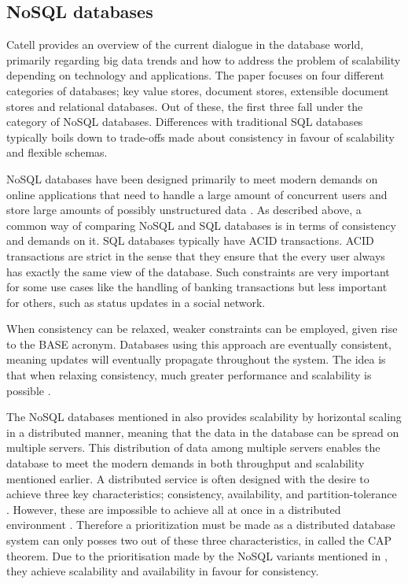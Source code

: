 \subsection{NoSQL databases}
Catell \cite{Catell} provides an overview of the current dialogue in the database world, primarily regarding big data trends and how to address the problem of scalability depending on technology and applications. The paper focuses on four different categories of databases; key value stores, document stores, extensible document stores and relational databases. Out of these, the first three fall under the category of NoSQL databases. Differences with traditional SQL databases typically boils down to trade-offs made about consistency in favour of scalability and flexible schemas. 

NoSQL databases have been designed primarily to meet modern demands on online applications that need to handle a large amount of concurrent users and store large amounts of possibly unstructured data \cite{Catell}.
As described above, a common way of comparing NoSQL and SQL databases is in terms of consistency and demands on it. SQL databases typically have ACID \cite{Mullins} transactions. ACID transactions are strict in the sense that they ensure that the every user always has exactly the same view of the database. Such constraints are very important for some use cases like the handling of banking transactions but less important for others, such as status updates in a social network.

When consistency can be relaxed, weaker constraints can be employed, given rise to the BASE \cite{Catell} acronym. Databases using this approach are eventually consistent, meaning updates will eventually propagate throughout the system. The idea is that when relaxing consistency, much greater performance and scalability is possible \cite{Catell}.

The NoSQL databases mentioned in \cite{Catell} also provides scalability by horizontal scaling in a distributed manner, meaning that the data in the database can be spread on multiple servers. This distribution of data among multiple servers enables the database to meet the modern demands in both throughput and scalability \cite{Abadi} mentioned earlier. A distributed service is often designed with the desire to achieve three key characteristics; consistency, availability, and partition-tolerance \cite{Brewer}. However, these are impossible to achieve all at once in a distributed environment \cite{Brewer}. Therefore a prioritization must be made as a distributed database system can only posses two out of these three characteristics, in \cite{Brewer} called the CAP theorem. Due to the prioritisation made by the NoSQL variants mentioned in \cite{Catell}, they achieve scalability and availability in favour for consistency. 

